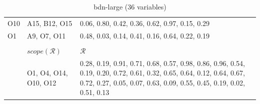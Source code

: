 \documentclass{article}
\begin{document}
\begin{table}[h]
\begin{tabular}{@{}llp{6cm}@{}}
				O10 & A15, B12, O15 & 0.06, 0.80, 0.42, 0.36, 0.62, 0.97, 0.15, 0.29 \\
				O1 & A9, O7, O11 & 0.48, 0.03, 0.14, 0.41, 0.16, 0.64, 0.22, 0.19 \\
				\bottomrule
				\\
				& $scope(\mathcal{R})$ & $\mathcal{R}$ \\
				\midrule
				& O1, O4, O14, O10, O12 & 0.28, 0.19, 0.91, 0.71, 0.68, 0.57, 0.98, 0.86, 0.96, 0.54, 0.19, 0.20, 0.72, 0.61, 0.32, 0.65, 0.64, 0.12, 0.64, 0.67, 0.72, 0.27, 0.05, 0.07, 0.63, 0.09, 0.55, 0.45, 0.19, 0.02, 0.51, 0.13
			\end{tabular}
			\caption{bdn-large (36 variables)}
			\label{table:large}
		\end{table}
\end{document}
